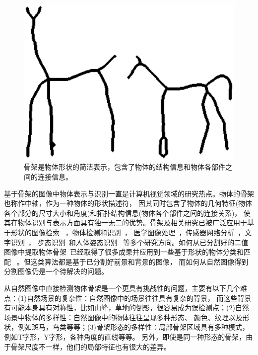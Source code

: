 \documentclass[UTF8]{ctexart}
\numberwithin{equation}{section} %
\numberwithin{table}{section} %
\begin{document}
\begin{figure}[!htb]
\centering
\includegraphics[scale=0.3]{figures/sk_demo1.eps}
\caption{骨架是物体形状的简洁表示，包含了物体的结构信息和物体各部件之间的连接信息。}
\end{figure}

基于骨架的图像中物体表示与识别一直是计算机视觉领域的研究热点。物体的骨架也称作中轴，作为一种物体的形状描述符，
因其同时包含了物体的几何特征(物体各个部分的尺寸大小和角度)和拓扑结构信息(物体各个部件之间的连接关系)，
使其在物体识别与表示方面具有独一无二的优势。骨架及相关研究已被广泛应用于基于形状的图像检索
~\cite{demirci2006object,sebastian2004recognition}，物体检测和识别~\cite{bai2009active, trinh2011skeleton}，
医学图像处理~\cite{sorantin2002spiral}，传感器网络分析~\cite{jiang2009case}，文字识别~\cite{zhang2015symmetry}，
步态识别~\cite{wagg2004automated,tanawongsuwan2001gait}和人体姿态识别~\cite{shotton2013real,girshick2011efficient,sun2012conditional}
等多个研究方向。如何从已分割好的二值图像中提取物体骨架~\cite{saha2016survey}已经取得了很多成果并应用到一些基于形状的物体分类和匹配
~\cite{demirci2006object,sebastian2004recognition,siddiqi1999shock}。但这类算法都是基于已分割好前景和背景的图像，
而如何从自然图像得到分割图像仍是一个待解决的问题。

从自然图像中直接检测物体骨架是一个更具有挑战性的问题，主要有以下几个难点：(1)自然场景的复杂性：自然图像中的场景往往具有复杂的背景，
而这些背景有可能本身具有对称性，比如山峰，草地的倒影，很容易成为误检测点；(2)自然场景中物体的多样性：自然图像中的物体往往呈现多种形态、
颜色、纹理以及形状，例如斑马，鸟类等等；(3)骨架形态的多样性：局部骨架区域具有多种模式，例如T字形，Y字形，各种角度的直线等等。
另外，即使是同一种形态的骨架，由于骨架尺度不一样，他们的局部特征也有很大的差异。
\end{document}
